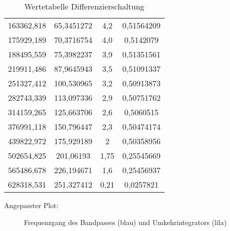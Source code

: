 \begin{table}[htbp]
\begin{tabular}{c|c|c|c}
      163362,818 & 65,3451272 & 4,2 & 0,51564209 \\
      175929,189 & 70,3716754 & 4,0 & 0,5142079 \\
      188495,559 & 75,3982237 & 3,9 & 0,51351561 \\
      219911,486 & 87,9645943 & 3,5 & 0,51091337 \\
      251327,412 & 100,530965 & 3,2 & 0,50913873 \\
      282743,339 & 113,097336 & 2,9 & 0,50751762 \\
      314159,265 & 125,663706 & 2,6 & 0,5060515 \\
      376991,118 & 150,796447 & 2,3 & 0,50474174 \\
      439822,972 & 175,929189 & 2 & 0,50358956 \\
      502654,825 & 201,06193 & 1,75 & 0,25545669 \\
      565486,678 & 226,194671 & 1,6 & 0,25456937 \\
      628318,531 & 251,327412 & 0,21 & 0,0257821 \\
      \end{tabular}%
      \caption{Wertetabelle Differenzierschaltung}
  \end{table}\newpage
  Angepasster Plot:
\begin{figure}[h]
    \centering\scalebox{1}{}
    \caption{Frequenzgang des Bandpasses (blau) und Umkehrintegrators (lila)}
\end{figure}